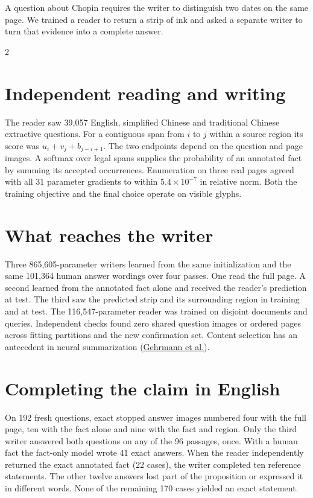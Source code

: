 \noindent A question about Chopin requires the writer to distinguish two dates on the same page. We trained a reader to return a strip of ink and asked a separate writer to turn that evidence into a complete answer.
\begin{multicols}{2}
\section*{Independent reading and writing}
The reader saw 39,057 English, simplified Chinese and traditional Chinese extractive questions. For a contiguous span from $i$ to $j$ within a source region its score was $u_i+v_j+b_{j-i+1}$. The two endpoints depend on the question and page images. A softmax over legal spans supplies the probability of an annotated fact by summing its accepted occurrences. Enumeration on three real pages agreed with all 31 parameter gradients to within $5.4\times10^{-7}$ in relative norm. Both the training objective and the final choice operate on visible glyphs.
\section*{What reaches the writer}
Three 865,605-parameter writers learned from the same initialization and the same 101,364 human answer wordings over four passes. One read the full page. A second learned from the annotated fact alone and received the reader's prediction at test. The third saw the predicted strip and its surrounding region in training and at test. The 116,547-parameter reader was trained on disjoint documents and queries. Independent checks found zero shared question images or ordered pages across fitting partitions and the new confirmation set. Content selection has an antecedent in neural summarization (\href{https://aclanthology.org/D18-1443/}{Gehrmann et al.}).
\section*{Completing the claim in English}
On 192 fresh questions, exact stopped answer images numbered four with the full page, ten with the fact alone and nine with the fact and region. Only the third writer answered both questions on any of the 96 passages, once. With a human fact the fact-only model wrote 41 exact answers. When the reader independently returned the exact annotated fact (22 cases), the writer completed ten reference statements. The other twelve answers lost part of the proposition or expressed it in different words. None of the remaining 170 cases yielded an exact statement.
\end{multicols}
